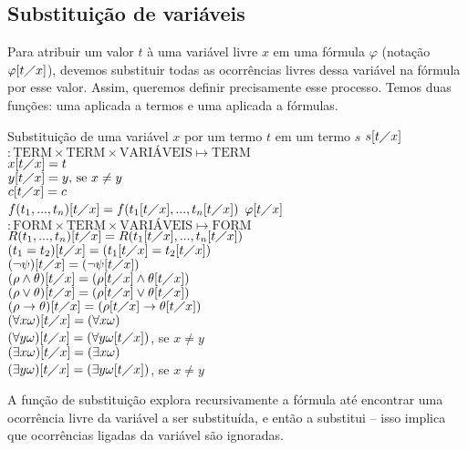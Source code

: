 \subsection{Substituição de variáveis}

Para atribuir um valor $t$ à uma variável livre $x$ em uma fórmula $\varphi$ (notação $\varphi[t\diagup x]$), devemos substituir todas as ocorrências livres dessa variável na fórmula por esse valor. Assim, queremos definir precisamente esse processo. Temos duas funções: uma aplicada a termos e uma aplicada a fórmulas.
\begin{definition}{Substituição de uma variável $x$ por um termo $t$ em um termo $s$}
    $s[t\diagup x]$$: \text{TERM} \times \text{TERM} \times \text{VARIÁVEIS} \mapsto \text{TERM}$ \\
    $x[t\diagup x] = t$ \\
    $y[t\diagup x] = y \text{, se } x \neq y$ \\
    $c[t\diagup x] = c$ \\
    $f(t_1,...,t_n)[t\diagup x] = f(t_1[t\diagup x],...,t_n[t\diagup x])$
    $\varphi[t\diagup x]$$: \text{FORM} \times \text{TERM} \times \text{VARIÁVEIS} \mapsto \text{FORM}$ \\
    $R(t_1,...,t_n)[t\diagup x] = R(t_1[t\diagup x],...,t_n[t\diagup x])$ \\
    $(t_1 = t_2)[t\diagup x] = (t_1[t\diagup x] = t_2[t\diagup x])$ \\
    $(\neg \psi)[t\diagup x] = (\neg \psi[t\diagup x])$ \\
    $(\rho \land \theta)[t\diagup x] = (\rho[t\diagup x] \land \theta[t\diagup x])$ \\
    $(\rho \lor \theta)[t\diagup x] = (\rho[t\diagup x] \lor \theta[t\diagup x])$ \\
    $(\rho \rightarrow \theta)[t\diagup x] = (\rho[t\diagup x] \rightarrow \theta[t\diagup x])$ \\
    $(\forall x \omega)[t\diagup x] = (\forall x \omega)$ \\
    $(\forall y \omega)[t\diagup x] = (\forall y \omega[t\diagup x])$, se $x \neq y$ \\
    $(\exists x \omega)[t\diagup x] = (\exists x \omega)$ \\
    $(\exists y \omega)[t\diagup x] = (\exists y \omega[t\diagup x])$, se $x \neq y$
\end{definition}

A função de substituição explora recursivamente a fórmula até encontrar uma ocorrência livre da variável a ser substituída, e então a substitui -- isso implica que ocorrências ligadas da variável são ignoradas.

